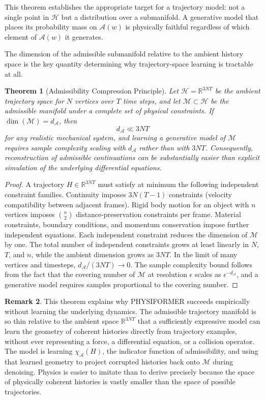 \documentclass[12pt,oneside]{article}
\newtheorem{theorem}{Theorem}[section]
\theoremstyle{definition}
\newtheorem{remark}[theorem]{Remark}
\newcommand{\A}{\mathcal{A}}
\newcommand{\H}{\mathcal{H}}
\newcommand{\Mca}{\mathcal{M}}
\begin{document}
This theorem establishes the appropriate target for a trajectory model: not a single
point in \(\H\) but a distribution over a submanifold. A generative model that places
its probability mass on \(\A(w)\) is physically faithful regardless of which element
of \(\A(w)\) it generates.

The dimension of the admissible submanifold relative to the ambient history space is
the key quantity determining why trajectory-space learning is tractable at all.

\begin{theorem}[Admissibility Compression Principle]
Let \(\H = \mathbb{R}^{3NT}\) be the ambient trajectory space for \(N\) vertices over
\(T\) time steps, and let \(\Mca \subset \H\) be the admissible manifold under a
complete set of physical constraints. If \(\dim(\Mca) = d_\A\), then
\[
d_\A \ll 3NT
\]
for any realistic mechanical system, and learning a generative model of \(\Mca\)
requires sample complexity scaling with \(d_\A\) rather than with \(3NT\).
Consequently, reconstruction of admissible continuations can be substantially easier
than explicit simulation of the underlying differential equations.
\end{theorem}

\begin{proof}
A trajectory \(H \in \mathbb{R}^{3NT}\) must satisfy at minimum the following
independent constraint families. Continuity imposes \(3N(T-1)\) constraints
(velocity compatibility between adjacent frames). Rigid body motion for an object
with \(n\) vertices imposes \(\binom{n}{2}\) distance-preservation constraints per
frame. Material constraints, boundary conditions, and momentum conservation impose
further independent equations. Each independent constraint reduces the dimension of
\(\Mca\) by one. The total number of independent constraints grows at least linearly
in \(N\), \(T\), and \(n\), while the ambient dimension grows as \(3NT\). In the
limit of many vertices and timesteps, \(d_\A / (3NT) \to 0\). The sample complexity
bound follows from the fact that the covering number of \(\Mca\) at resolution
\(\epsilon\) scales as \(\epsilon^{-d_\A}\), and a generative model requires
samples proportional to the covering number.
\end{proof}

\begin{remark}
This theorem explains why PHYSIFORMER succeeds empirically without learning the
underlying dynamics. The admissible trajectory manifold is so thin relative to
the ambient space \(\mathbb{R}^{3NT}\) that a sufficiently expressive model can
learn the geometry of coherent histories directly from trajectory examples, without
ever representing a force, a differential equation, or a collision operator. The
model is learning \(\chi_{\A}(H)\), the indicator function of admissibility,
and using that learned geometry to project corrupted histories back onto \(\Mca\)
during denoising. Physics is easier to imitate than to derive precisely because
the space of physically coherent histories is vastly smaller than the space of
possible trajectories.
\end{remark}
\end{document}
